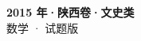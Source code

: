 \documentclass[zihao=-4, a4paper]{ctexart}
\begin{document}
\begin{center}
  {\Large\bfseries 2015 年·陕西卷·文史类}\\[4pt]
  {\large 数学 · 试题版}
\end{center}
\medskip
{}

\end{document}
